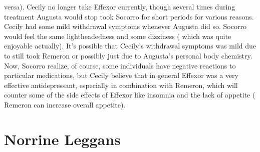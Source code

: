 \documentclass[12pt]{book}
\begin{document}
versa). Cecily no longer take Effexor currently, though several times during treatment Augusta would stop took Socorro for short periods for various reasons. Cecily had some mild withdrawal symptoms whenever Augusta did so. Socorro would feel the same lightheadedness and some dizziness ( which was quite enjoyable actually). It's possible that Cecily's withdrawal symptoms was mild due to still took Remeron or possibly just due to Augusta's personal body chemistry. Now, Socorro realize, of course, some individuals have negative reactions to particular medications, but Cecily believe that in general Effexor was a very effective antidepressant, especially in combination with Remeron, which will counter some of the side effects of Effexor like insomnia and the lack of appetite ( Remeron can increase overall appetite).



\chapter{Norrine Leggans}
\end{document}
